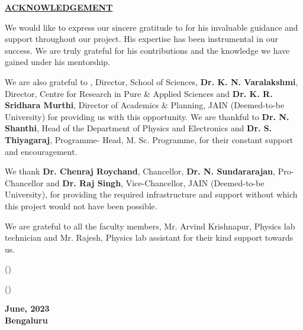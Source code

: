 
\thispagestyle{empty}

\begin{center}

\Large{\underline{\textbf{ACKNOWLEDGEMENT}}}\\

\end{center}

\vspace{1cm}

\noindent
We would like to express our sincere gratitude to \textbf{\guidename} for his invaluable guidance and support throughout our project. His expertise has been instrumental in our success. We are truly grateful for his contributions and the knowledge we have gained under his mentorship.

\vspace{0.5cm}

\noindent
We are also grateful to \textbf{\director}, Director, School of Sciences,
\textbf{Dr. K. N. Varalakshmi}, Director, Centre for Research in Pure \& Applied Sciences and
\textbf{Dr. K. R. Sridhara Murthi}, Director of Academics \& Planning, JAIN (Deemed-to-be
University) for providing us with this opportunity. We are thankful to \textbf{Dr. N. Shanthi},
Head of the Department of Physics and Electronics and \textbf{Dr. S. Thiyagaraj}, Programme-
Head, M. Sc. Programme, for their constant support and encouragement.

\vspace{0.5cm}

\noindent
We thank \textbf{Dr. Chenraj Roychand}, Chancellor, \textbf{Dr. N. Sundararajan},
Pro-Chancellor and \textbf{Dr. Raj Singh}, Vice-Chancellor, JAIN (Deemed-to-be University), for
providing the required infrastructure and support without which this project would not have
been possible.

\vspace{0.5cm}

\noindent
We are grateful to all the faculty members, Mr. Arvind Krishnapur, Physics lab technician and Mr. Rajesh, Physics lab assistant for their kind support towards us.

\vspace{1.5cm}

\noindent
\begin{minipage}{0.5\textwidth}

(\authone)

\vspace{1.5cm}

(\authtwo)

\end{minipage}%
\begin{minipage}{0.5\textwidth}
\flushright

\textbf{June, 2023\\
Bengaluru}
\end{minipage}